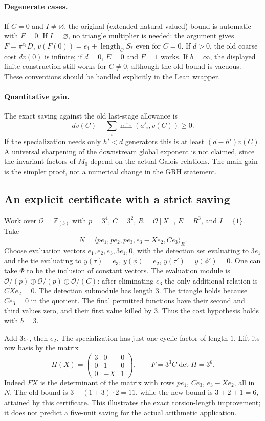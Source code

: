 \documentclass[11pt]{article}
\newcommand{\OO}{\mathcal O}\newcommand{\FF}{\operatorname{Fitt}_0}\newcommand{\len}{\operatorname{length}_{\OO}}\newcommand{\val}{\operatorname{v}}\newcommand{\Hom}{\operatorname{Hom}}\newcommand{\Span}{\operatorname{span}}\newcommand{\code}[1]{\texttt{\detokenize{#1}}}
\begin{document}
\paragraph{Degenerate cases.} If $C=0$ and $I\ne\varnothing$, the original (extended-natural-valued) bound is automatic with $F=0$. If $I=\varnothing$, no triangle multiplier is needed: the argument gives $F=\pi^{e_1}D$, $v(F(0))=e_1+\len S_*$ even for $C=0$. If $d>0$, the old coarse cost $d v(0)$ is infinite; if $d=0$, $E=0$ and $F=1$ works. If $b=\infty$, the displayed finite construction still works for $C\ne0$, although the old bound is vacuous. These conventions should be handled explicitly in the Lean wrapper.

\paragraph{Quantitative gain.} The exact saving against the old last-stage allowance is
\[
 d v(C)-\sum_i\min(a'_i,v(C))\ge0.
\]
If the specialization needs only $h'<d$ generators this is at least $(d-h')v(C)$. A universal sharpening of the downstream global exponent is not claimed, since the invariant factors of $M_0$ depend on the actual Galois relations. The main gain is the simpler proof, not a numerical change in the GRH statement.
\subsection{An explicit certificate with a strict saving}
Work over $\OO=\mathbb Z_{(3)}$ with $p=3^4$, $C=3^2$, $R=\OO[X]$, $E=R^3$, and $I=\{1\}$. Take
\[
 N=\langle p e_1,p e_2,p e_3,e_3-Xe_2,Ce_3\rangle_R.
\]
Choose evaluation vectors $e_1,e_2,e_3,3e_1,0$, with the detection set evaluating to $3e_1$ and the tie evaluating to $y(\tau)=e_3$, $y(\phi)=e_2$, $y(\tau')=y(\phi')=0$. One can take $\Phi$ to be the inclusion of constant vectors. The evaluation module is $\OO/(p)\oplus\OO/(p)\oplus\OO/(C)$: after eliminating $e_3$ the only additional relation is $CXe_2=0$. The detection submodule has length $3$. The triangle holds because $Ce_3=0$ in the quotient. The final permitted functions have their second and third values zero, and their first value killed by $3$. Thus the cost hypothesis holds with $b=3$.

Add $3e_1$, then $e_2$. The specialization has just one cyclic factor of length $1$. Lift its row basis by the matrix
\[
 H(X)=\begin{pmatrix}3&0&0\\0&1&0\\0&-X&1\end{pmatrix},\qquad F=3^3 C\det H=3^6.
\]
Indeed $FX$ is the determinant of the matrix with rows $p e_1$, $Ce_3$, $e_3-Xe_2$, all in $N$. The old bound is $3+(1+3)\cdot2=11$, while the new bound is $3+2+1=6$, attained by this certificate. This illustrates the exact torsion-length improvement; it does not predict a five-unit saving for the actual arithmetic application.
\end{document}
